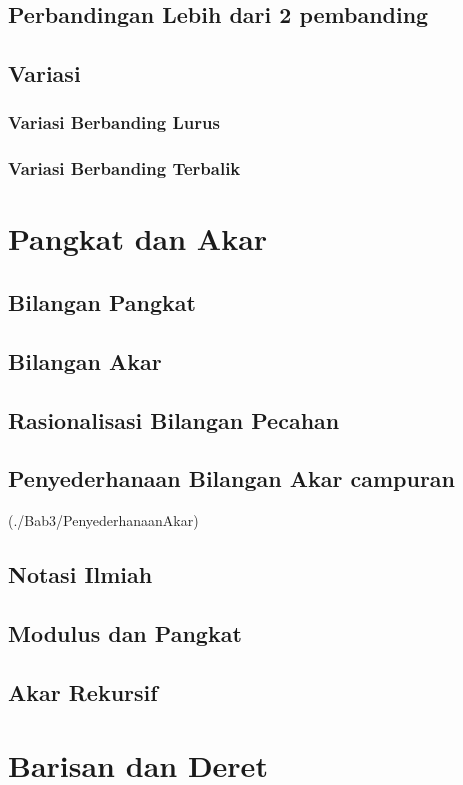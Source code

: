 \documentclass[12pt,a4paper,twoside,openany]{book}
\begin{document}
\section{Perbandingan Lebih dari 2 pembanding}
	
\section{Variasi}
\subsection{Variasi Berbanding Lurus}
	
\subsection{Variasi Berbanding Terbalik}
	

\chapter{Pangkat dan Akar}
\section{Bilangan Pangkat}
		
\section{Bilangan Akar }
		
\section{Rasionalisasi Bilangan Pecahan}
		
\section{Penyederhanaan Bilangan Akar campuran}
		(./Bab3/PenyederhanaanAkar)
\section{Notasi Ilmiah}
\section{Modulus dan Pangkat}
\section{Akar Rekursif}


\chapter{Barisan dan Deret}
\end{document}
